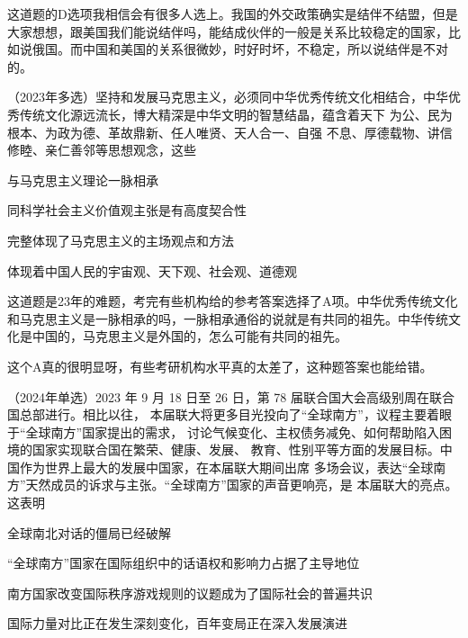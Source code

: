 \documentclass[lang=cn,newtx,10pt,scheme=chinese,pad,twocol]{zznote}
\begin{document}
\begin{solution}
	这道题的D选项我相信会有很多人选上。我国的外交政策确实是结伴不结盟，但是大家想想，跟美国我们能说结伴吗，能结成伙伴的一般是关系比较稳定的国家，比如说俄国。而中国和美国的关系很微妙，时好时坏，不稳定，所以说结伴是不对的。
\end{solution}
\begin{example} （2023年多选）坚持和发展马克思主义，必须同中华优秀传统文化相结合，中华优 秀传统文化源远流长，博大精深是中华文明的智慧结晶，蕴含着天下  为公、民为根本、为政为德、革故鼎新、任人唯贤、天人合一、自强
	不息、厚德载物、讲信修睦、亲仁善邻等思想观念，这些
	\begin{choice}
		\item  与马克思主义理论一脉相承
		\item 同科学社会主义价值观主张是有高度契合性
		\item 完整体现了马克思主义的主场观点和方法
		\item 体现着中国人民的宇宙观、天下观、社会观、道德观
	\end{choice}
\end{example}
\begin{solution}
	这道题是23年的难题，考完有些机构给的参考答案选择了A项。中华优秀传统文化和马克思主义是一脉相承的吗，一脉相承通俗的说就是有共同的祖先。中华传统文化是中国的，马克思主义是外国的，怎么可能有共同的祖先。
\end{solution}
\begin{remark}
	这个A真的很明显呀，有些考研机构水平真的太差了，这种题答案也能给错。
\end{remark}
\begin{example}	（2024年单选）2023 年 9 月 18 日至 26 日，第 78 届联合国大会高级别周在联合国总部进行。相比以往， 本届联大将更多目光投向了“全球南方”，议程主要着眼于“全球南方”国家提出的需求， 讨论气候变化、主权债务减免、如何帮助陷入困境的国家实现联合国在繁荣、健康、发展、 教育、性别平等方面的发展目标。中国作为世界上最大的发展中国家，在本届联大期间出席 多场会议，表达“全球南方”天然成员的诉求与主张。“全球南方”国家的声音更响亮，是 本届联大的亮点。这表明
	\begin{choice}
		\item 全球南北对话的僵局已经破解
		\item “全球南方”国家在国际组织中的话语权和影响力占据了主导地位
		\item 南方国家改变国际秩序游戏规则的议题成为了国际社会的普遍共识
		\item 国际力量对比正在发生深刻变化，百年变局正在深入发展演进
	\end{choice}
\end{example}
\end{document}

